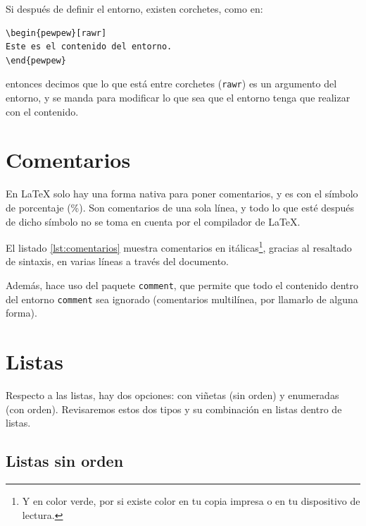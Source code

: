 Si después de definir el entorno, existen corchetes, como en:

\begin{lstlisting}[style=latex,numbers=none]
\begin{pewpew}[rawr]
Este es el contenido del entorno.
\end{pewpew}
\end{lstlisting}

\noindent entonces decimos que lo que está entre corchetes (\texttt{rawr}) es un argumento del entorno, y se manda para modificar lo que sea que el entorno tenga que realizar con el contenido.



\section{Comentarios}
\label{sec:comentarios}



En \LaTeX{} solo hay una forma nativa para poner comentarios, y es con el símbolo de porcentaje (\%). Son comentarios de una sola línea, y todo lo que esté después de dicho símbolo no se toma en cuenta por el compilador de \LaTeX{}.

El listado \ref{lst:comentarios} muestra comentarios en itálicas\footnote{Y en color verde, por si existe color en tu copia impresa o en tu dispositivo de lectura.}, gracias al resaltado de sintaxis, en varias líneas a través del documento.

Además,  hace uso del paquete \texttt{comment}, que permite que todo el contenido dentro del entorno \texttt{comment} sea ignorado (comentarios multilínea, por llamarlo de alguna forma).





\section{Listas}
\label{sec:listas}



Respecto a las listas, hay dos opciones: con viñetas (sin orden) y enumeradas (con orden). Revisaremos estos dos tipos y su combinación en listas dentro de listas.



\subsection{Listas sin orden}
\label{sub:listas_sin_orden}



